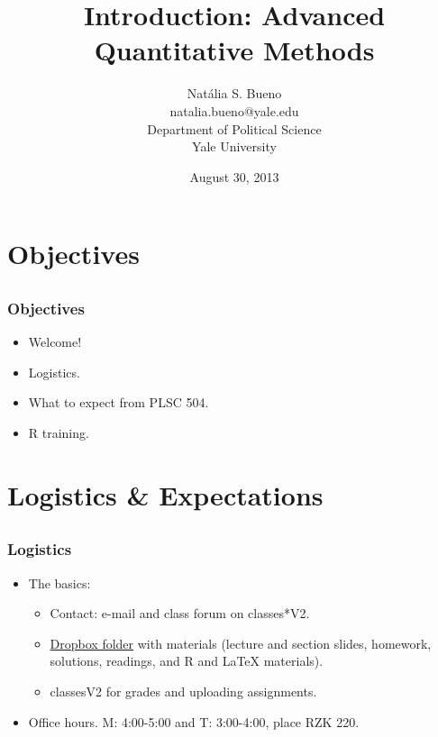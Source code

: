 \documentclass{beamer} %
\title{Introduction: Advanced Quantitative Methods}
\author{Nat\'{a}lia S. Bueno
\\natalia.bueno@yale.edu
\\Department of Political Science
\\Yale University}
\date{August 30, 2013}
\begin{document}

\frame{\titlepage} %

\section{Objectives}

\subsection{} %
\frame %
{ %
\frametitle{Objectives} %
\begin{itemize}
\item Welcome!
\item Logistics.
\item What to expect from PLSC 504.
\item R training.
\end{itemize}
} %

\section{Logistics \& Expectations}

\subsection{}
\frame
{
\frametitle{Logistics}
\begin{itemize}
\pause \item The basics: %
\begin{itemize}
\item Contact: e-mail and class forum on classes*V2.
\item \href{https://www.dropbox.com/sh/8gos1knztfhdgty/IzxBeqKvUW}{Dropbox folder} with materials (lecture and section slides, homework, solutions, readings, and R and \LaTeX{} materials).
\item classesV2 for grades and uploading assignments.
\end{itemize}
\pause \item Office hours. M: 4:00-5:00 and T: 3:00-4:00, place RZK 220.   
\end{itemize}
}
\end{document}
